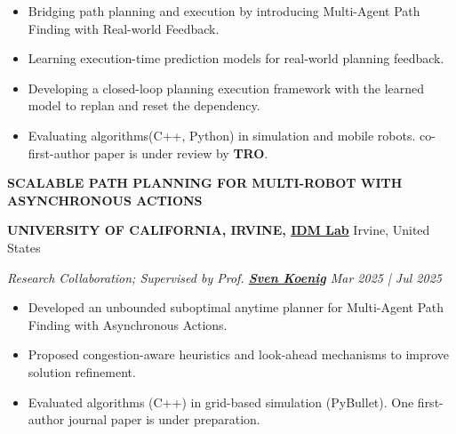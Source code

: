 \documentclass[a4paper,9pt]{extarticle}
\begin{document}
\begin{itemize}
    \item Bridging path planning and execution by introducing Multi-Agent Path Finding with Real-world Feedback. 
    \item Learning execution-time prediction models for real-world planning feedback.
    \item Developing a closed-loop planning execution framework with the learned model to replan and reset the dependency. 
    \item Evaluating algorithms(C++, Python) in simulation and mobile robots. co-first-author paper is under review by \textbf{TRO}.
\end{itemize}
{\textbf{\fontsize{12pt}{4pt}\selectfont S}\textbf{\scshape CALABLE PATH PLANNING FOR MULTI-ROBOT WITH ASYNCHRONOUS ACTIONS}}
\par\vspace{4pt}\noindent
\par\textbf{UNIVERSITY OF CALIFORNIA, IRVINE, {\href{https://idm-lab.org/group.html}{IDM Lab}}} \hfill Irvine, United States  %
\par\textit{Research Collaboration; Supervised by Prof. {\href{https://idm-lab.org/index.html}{\textbf{Sven Koenig}}} \hfill  Mar 2025 | Jul 2025}  %
\begin{itemize}
    \item Developed an unbounded suboptimal anytime planner for Multi-Agent Path Finding with Asynchronous Actions.
    \item Proposed congestion-aware heuristics and look-ahead mechanisms to improve solution refinement.
    \item Evaluated algorithms (C++) in grid-based simulation (PyBullet). One first-author journal paper is under preparation.
\end{itemize}
\end{document}
